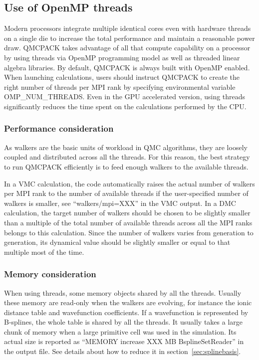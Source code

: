 \subsection{Use of OpenMP threads}
\label{sec:openmprunning}
Modern processors integrate multiple identical cores even with hardware threads on a single die to increase the total performance and maintain a reasonable power draw. 
QMCPACK takes advantage of all that compute capability on a processor by using threads via OpenMP programming model as well as threaded linear algebra libraries. By default, QMCPACK is always built with OpenMP enabled. When launching calculations, users should instruct QMCPACK to create the right number of threads per MPI rank by specifying environmental variable OMP\_NUM\_THREADS. Even in the GPU accelerated version, using threads significantly reduces the time spent on the calculations performed by the CPU.

\subsubsection{Performance consideration}
As walkers are the basic units of workload in QMC algorithms, they are loosely coupled and distributed across all the threads. For this reason, the best strategy to run QMCPACK efficiently is to feed enough walkers to the available threads.

In a VMC calculation, the code automatically raises the actual number of walkers per MPI rank to the number of available threads if the user-specified number of walkers is smaller, see ``walkers/mpi=XXX'' in the VMC output. 
In a DMC calculation, the target number of walkers should be chosen to be slightly smaller than a multiple of the total number of available threads across all the MPI ranks belongs to this calculation. Since the number of walkers varies from generation to generation, its dynamical value should be slightly smaller or equal to that multiple most of the time.

\subsubsection{Memory consideration}
When using threads, some memory objects shared by all the threads. Usually these memory are read-only when the walkers are evolving, for instance the ionic distance table and wavefunction coefficients.
If a wavefunction is represented by B-splines, the whole table is shared by all the threads. It usually takes a large chunk of memory when a large primitive cell was used in the simulation. Its actual size is reported as ``MEMORY increase XXX MB BsplineSetReader'' in the output file. 
See details about how to reduce it in section~\ref{sec:splinebasis}.

